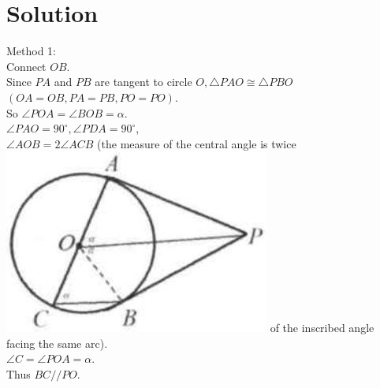 \documentclass{article}
\begin{document}
\section*{Solution}
Method 1:\\
Connect \(O B\).\\
Since \(P A\) and \(P B\) are tangent to circle \(O, \triangle P A O \cong \triangle P B O\) \((O A=O B, P A=P B, P O=P O)\).\\
So \(\angle P O A=\angle B O B=\alpha\).\\
\(\angle P A O=90^{\circ}, \angle P D A=90^{\circ}\),\\
\(\angle A O B=2 \angle A C B\) (the measure of the central angle is twice\\
\includegraphics[width=\textwidth]{images/reasoning_image_1.jpg} of the inscribed angle facing the same arc).\\
\(\angle C=\angle P O A=\alpha\).\\
Thus \(B C / / P O\).
\end{document}
